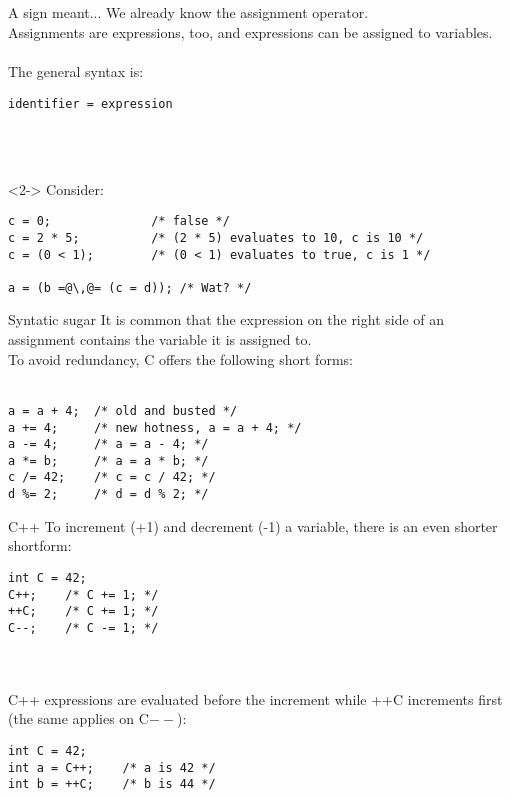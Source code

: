 \subsection{}
\begin{frame}[fragile]{A sign meant...}
	We already know the assignment operator.\\
	Assignments are expressions, too, and expressions can be assigned to variables.\\\ \\
	The general syntax is:
	\begin{lstlisting}[numbers=none,basicstyle=\itshape\footnotesize]
identifier = expression
\end{lstlisting}\ \\\ \\
	
	\begin{uncoverenv}<2->
		Consider:
		\begin{lstlisting}[numbers=none]
c = 0;				/* false */
c = 2 * 5;			/* (2 * 5) evaluates to 10, c is 10 */
c = (0 < 1);		/* (0 < 1) evaluates to true, c is 1 */

a = (b =@\,@= (c = d));	/* Wat? */
\end{lstlisting}
	\end{uncoverenv}
\end{frame}
\begin{frame}[fragile]{Syntatic sugar}
	It is common that the expression on the right side of an assignment contains the variable it is assigned to.\\
	To avoid redundancy, C offers the following short forms:\\\ \\
	\begin{lstlisting}[numbers=none]
a = a + 4;	/* old and busted */
a += 4;		/* new hotness, a = a + 4; */
a -= 4;		/* a = a - 4; */
a *= b;		/* a = a * b; */
c /= 42;	/* c = c / 42; */
d %= 2;		/* d = d % 2; */
\end{lstlisting}
\end{frame}
\begin{frame}[fragile]{C++}
	To increment (+1) and decrement (-1) a variable, there is an even shorter shortform:
	\begin{lstlisting}[numbers=none]
int C = 42;
C++;	/* C += 1; */
++C;	/* C += 1; */
C--;	/* C -= 1; */
\end{lstlisting}
\ \\\ \\C++ expressions are evaluated before the increment while ++C increments first (the same applies on C$--$):
	\begin{lstlisting}[numbers=none]
int C = 42;
int a = C++;	/* a is 42 */
int b = ++C;	/* b is 44 */
\end{lstlisting}
\end{frame}
